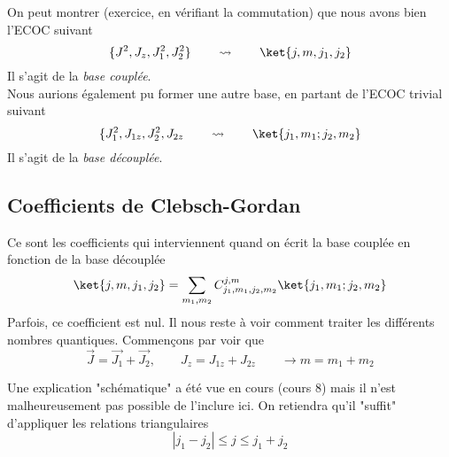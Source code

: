 On peut montrer (exercice, en vérifiant la commutation) que nous avons bien l'ECOC suivant
\begin{equation}
\{J^2, J_z, J_1^2, J_2^2\}\qquad\rightsquigarrow\qquad \ket{j,m,j_1,j_2}
\end{equation}
Il s'agit de la \textit{base couplée}.\\
Nous aurions également pu former une autre base, en partant de l'ECOC trivial suivant
\begin{equation}
\{J_1^2, J_{1z}, J_2^2, J_{2z}\qquad\rightsquigarrow\qquad \ket{j_1,m_1;j_2,m_2}
\end{equation}
Il s'agit de la \textit{base découplée}.

\subsection{Coefficients de Clebsch-Gordan}
Ce sont les coefficients qui interviennent quand on écrit la base couplée en fonction 
de la base découplée
\begin{equation}
\ket{j,m,j_1,j_2} = \sum_{m_1, m_2} C^{j,m}_{j_1,m_1,j_2,m_2} \ket{j_1,m_1;j_2,m_2}
\end{equation}
Parfois, ce coefficient est nul. Il nous reste à voir comment traiter les différents 
nombres quantiques. Commençons par voir que
\begin{equation}
\vec{J} = \vec{J_1}+\vec{J_2},\qquad J_z = J_{1z}+J_{2z}\qquad \rightarrow m=m_1+m_2
\end{equation}

Une explication "schématique" a été vue en cours (cours 8) mais il n'est malheureusement 
pas possible de l'inclure ici. On retiendra qu'il "suffit" d'appliquer les relations 
triangulaires
\begin{equation}
|j_1-j_2| \leq j \leq j_1+j_2
\end{equation}
































